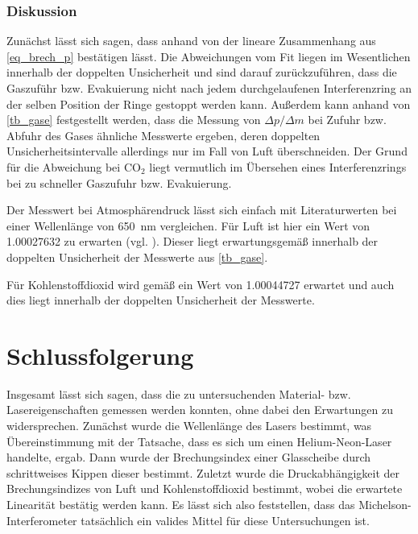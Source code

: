 \documentclass[
	a4paper,
	12pt,
	pagesize,
	ngerman
]{scrartcl}
\begin{document}
	\subsubsection{Diskussion}
	Zunächst lässt sich sagen, dass anhand von  der lineare Zusammenhang aus \cref{eq_brech_p} bestätigen lässt.
	Die Abweichungen vom Fit liegen im Wesentlichen innerhalb der doppelten Unsicherheit und sind darauf zurückzuführen, dass die Gaszuführ bzw. Evakuierung nicht nach jedem durchgelaufenen Interferenzring an der selben Position der Ringe gestoppt werden kann.
	Außerdem kann anhand von \cref{tb_gase} festgestellt werden, dass die Messung von $\Delta p/\Delta m$ bei Zufuhr bzw. Abfuhr des Gases ähnliche Messwerte ergeben, deren doppelten Unsicherheitsintervalle allerdings nur im Fall von Luft überschneiden.
	Der Grund für die Abweichung bei CO$_2$ liegt vermutlich im Übersehen eines Interferenzrings bei zu schneller Gaszufuhr bzw. Evakuierung.

	Der Messwert bei Atmosphärendruck lässt sich einfach mit Literaturwerten bei einer Wellenlänge von \SI{650}{nm} vergleichen.
	Für Luft ist hier ein Wert von \SI{1.00027632}{} zu erwarten (vgl. \cite{Brechungsindizes}).
	Dieser liegt erwartungsgemäß innerhalb der doppelten Unsicherheit der Messwerte aus \cref{tb_gase}.

	Für Kohlenstoffdioxid wird gemäß \cite{GlasFormula} ein Wert von \SI{1.00044727}{} erwartet und auch dies liegt innerhalb der doppelten Unsicherheit der Messwerte.


	\section{Schlussfolgerung}
	Insgesamt lässt sich sagen, dass die zu untersuchenden Material- bzw. Lasereigenschaften gemessen werden konnten, ohne dabei den Erwartungen zu widersprechen.
	Zunächst wurde die Wellenlänge des Lasers bestimmt, was Übereinstimmung mit der Tatsache, dass es sich um einen Helium-Neon-Laser handelte, ergab.
	Dann wurde der Brechungsindex einer Glasscheibe durch schrittweises Kippen dieser bestimmt.
	Zuletzt wurde die Druckabhängigkeit der Brechungsindizes von Luft und Kohlenstoffdioxid bestimmt, wobei die erwartete Linearität bestätig werden kann.
	Es lässt sich also feststellen, dass das Michelson-Interferometer tatsächlich ein valides Mittel für diese Untersuchungen ist. %

	\printbibliography
\end{document}
